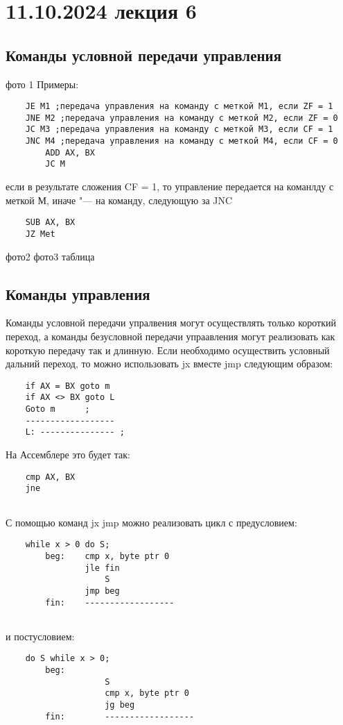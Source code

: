 \section{11.10.2024 лекция 6}
\subsection{Команды условной передачи управления}
фото 1
Примеры:

\begin{verbatim}
    JE M1 ;передача управления на команду с меткой М1, если ZF = 1
    JNE M2 ;передача управления на команду с меткой М2, если ZF = 0
    JC M3 ;передача управления на команду с меткой М3, если CF = 1
    JNC M4 ;передача управления на команду с меткой М4, если CF = 0
        ADD AX, BX
        JC M
\end{verbatim}
если в результате сложения CF = 1, то управление передается на команлду с меткой М, иначе "--- на команду, следующую за JNC
\begin{verbatim}
    SUB AX, BX
    JZ Met
\end{verbatim}
фото2 
фото3 таблица
\subsection{Команды управления}
Команды условной передачи упралвения могут осуществлять только короткий переход, а команды безусловной передачи упраавления могут реализовать как короткую передачу так и длинную. Если необходимо осуществить условный дальний переход, то можно использовать jx вместе jmp следующим образом:
\begin{verbatim}
    if AX = BX goto m 
    if AX <> BX goto L 
    Goto m      ;
    ------------------
    L: --------------- ;
\end{verbatim}
На Ассемблере это будет так:
\begin{verbatim}
    cmp AX, BX
    jne
    
\end{verbatim}

С помощью команд jx jmp можно реализовать цикл с предусловием:
\begin{verbatim}
    while x > 0 do S;
        beg:    cmp x, byte ptr 0
                jle fin 
                    S 
                jmp beg 
        fin:    ------------------
    
\end{verbatim}
и постусловием:
\begin{verbatim}
    do S while x > 0;
        beg:     
                    S 
                    cmp x, byte ptr 0
                    jg beg
        fin:        ------------------
\end{verbatim}
